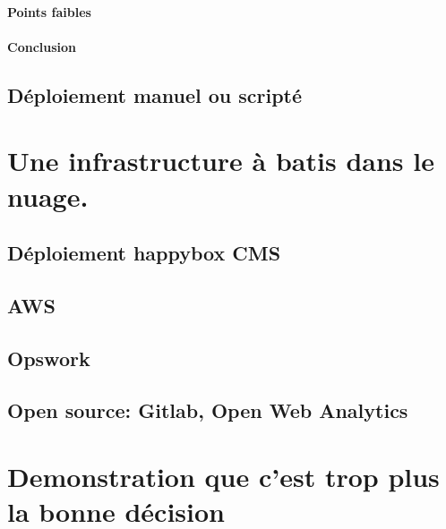 \documentclass[11pt, a4paper ]{article}
\let\stdsection\section
\renewcommand\section{\newpage\stdsection}
\begin{document}
\paragraph{Points faibles}

\paragraph{Conclusion}

			\subsection{Déploiement manuel ou scripté}

		\section{Une infrastructure à batis dans le nuage.}	 %

			\subsection{Déploiement happybox CMS}
			\subsection{AWS}

			\subsection{Opswork}

			\subsection{Open source: Gitlab, Open Web Analytics}

		\section{Demonstration que c'est trop plus la bonne décision} %
\end{document}
